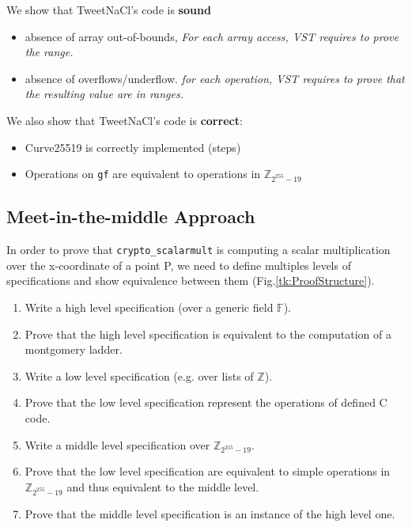 We show that TweetNaCl's code is \textbf{sound} \ie

\begin{itemize}
\item absence of array out-of-bounds,
\textit{For each array access, VST requires to prove the range.}
\item absence of overflows/underflow.
\textit{for each operation, VST requires to prove that the resulting value are in ranges.}
\end{itemize}

We also show that TweetNaCl's code is \textbf{correct}:

\begin{itemize}
\item Curve25519 is correctly implemented (steps)
\item Operations on \texttt{gf} are equivalent to operations in $\mathbb{Z}_{2^{255}-19}$
\end{itemize}

\subsection{Meet-in-the-middle Approach}

In order to prove that \texttt{crypto\_scalarmult} is computing a scalar
multiplication over the x-coordinate of a point P, we need to define multiples
levels of specifications and show equivalence between them (Fig.\ref{tk:ProofStructure}).

\begin{enumerate}
  \item Write a high level specification (over a generic field $\mathbb{F}$).
  \item Prove that the high level specification is equivalent to the
  computation of a montgomery ladder.
  \item Write a low level specification (e.g. over lists of $\mathbb{Z}$).
  \item Prove that the low level specification represent the operations of
  defined C code.
  \item Write a middle level specification over $\mathbb{Z}_{2^{255}-19}$.
  \item Prove that the low level specification are equivalent to simple
  operations in $\mathbb{Z}_{2^{255}-19}$ and thus equivalent to the middle level.
  \item Prove that the middle level specification is an instance of the high
  level one.
\end{enumerate}

